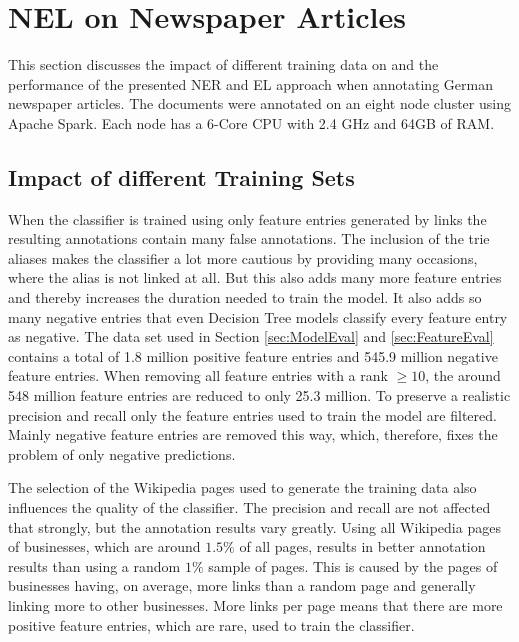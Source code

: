 \section{NEL on Newspaper Articles}
\label{sec:NELEval}
This section discusses the impact of different training data on and the performance of the presented NER and EL approach when annotating German newspaper articles. The documents were annotated on an eight node cluster using Apache Spark. Each node has a 6-Core CPU with 2.4 GHz and 64GB of RAM.\par

\subsection*{Impact of different Training Sets}
When the classifier is trained using only feature entries generated by links the resulting annotations contain many false annotations. The inclusion of the trie aliases makes the classifier a lot more cautious by providing many occasions, where the alias is not linked at all. But this also adds many more feature entries and thereby increases the duration needed to train the model. It also adds so many negative entries that even Decision Tree models classify every feature entry as negative. The data set used in Section \ref{sec:ModelEval} and \ref{sec:FeatureEval} contains a total of 1.8 million positive feature entries and 545.9 million negative feature entries. When removing all feature entries with a rank $\geq 10$, the around 548 million feature entries are reduced to only 25.3 million. To preserve a realistic precision and recall only the feature entries used to train the model are filtered. Mainly negative feature entries are removed this way, which, therefore, fixes the problem of only negative predictions.\par
The selection of the Wikipedia pages used to generate the training data also influences the quality of the classifier. The precision and recall are not affected that strongly, but the annotation results vary greatly. Using all Wikipedia pages of businesses, which are around $1.5\%$ of all pages, results in better annotation results than using a random $1\%$ sample of pages. This is caused by the pages of businesses having, on average, more links than a random page and generally linking more to other businesses. More links per page means that there are more positive feature entries, which are rare, used to train the classifier.\par

